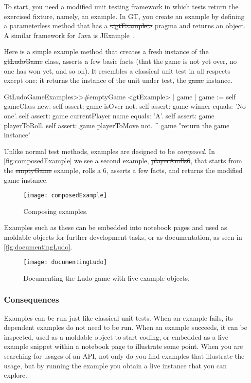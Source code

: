 \documentclass[sigconf]{acmart}
\begin{document}
To start, you need a modified unit testing framework in which tests return the exercised fixture, namely, an example.
In GT, you create an example by defining a parameterless method that has a \st{<gtExample>} pragma and returns an object.
A similar framework for Java is JExample~\cite{Kuhn08a}.

Here is a simple example method that creates a fresh instance of the \st{gtLudoGame} class, asserts a few basic facts (\ie that the game is not yet over, no one has won yet, and so on).
It resembles a classical unit test in all respects except one: it returns the instance of the unit under test, \ie the \st{game} instance.

\begin{code}
GtLudoGameExamples>>#emptyGame
	<gtExample>
	| game |
	game := self gameClass new.
	self assert: game isOver not.
	self assert: game winner equals: 'No one'.
	self assert: game currentPlayer name equals: 'A'.
	self assert: game playerToRoll.
	self assert: game playerToMove not.
	^ game  "return the game instance"
\end{code}

Unlike normal test methods, examples are designed to be \emph{composed}.
In \autoref{fig:composedExample} we see a second example, \st{playerArolls6}, that starts from the \st{emptyGame} example, rolls a $6$, asserts a few facts, and returns the modified game instance.

\begin{figure}[h]
  \texttt{[image: composedExample]}
  \caption{Composing examples.}
  \label{fig:composedExample}
\end{figure}

Examples such as these can be embedded into notebook pages and used as moldable objects for further development tasks, or as documentation, as seen in \autoref{fig:documentingLudo}.

\begin{figure}[h]
  \texttt{[image: documentingLudo]}
  \caption{Documenting the Ludo game with live example objects.}
  \label{fig:documentingLudo}
\end{figure}

    
\subsubsection*{Consequences}
Examples can be run just like classical unit tests.
When an example fails, its dependent examples do not need to be run.
When an example succeeds, it can be inspected, used as a moldable object to start coding, or embedded as a live example snippet within a notebook page to illustrate some point.
When you are searching for usages of an API, not only do you find examples that illustrate the usage, but by running the example you obtain a live instance that you can explore.
\end{document}
